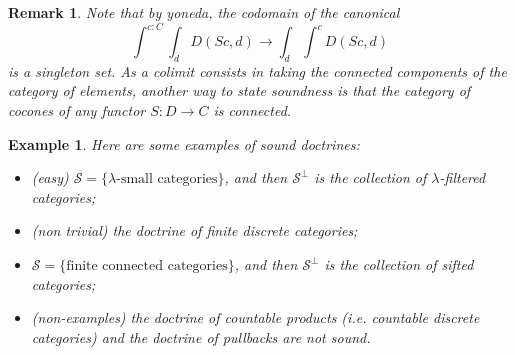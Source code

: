 \documentclass{article}
\newtheorem{example}[theorem]{Example}
\newtheorem{remark}[theorem]{Remark}
\begin{document}
\begin{remark}
  Note that by yoneda, the codomain of the canonical 
  \[
    \int^{c: C} \int_d D(S c, d) \rightarrow
    \int_d \int^{c}  D(S c, d) 
  \]
  is a singleton set.
  As a colimit consists in taking the connected components of the category of elements,
  another way to state soundness is that the category of cocones of any functor
  $S : D \rightarrow C$ is connected.
\end{remark}
\begin{example}
  Here are some examples \cite[Example 2.3]{lack_accessible} of sound doctrines:
  \begin{itemize}
  \item (easy)
    $\mathcal{S} = \{ \lambda\text{-small categories} \}$, and then
    $\mathcal{S}^\bot$ is the collection of $\lambda$-filtered categories;
  \item (non trivial) the doctrine of finite discrete categories;
  \item 
    $\mathcal{S} = \{ \text{finite connected categories} \}$, and then
    $\mathcal{S}^\bot$ is the collection of sifted categories;
    \item (non-examples) the doctrine of countable products (i.e. countable
      discrete categories) and the doctrine of pullbacks are not sound.
  \end{itemize}
\end{example}
\end{document}
